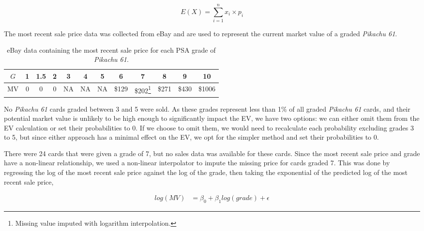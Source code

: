 \documentclass{article}
\begin{document}
$$E(X) = \sum_{i = 1}^{n} x_i \times p_i$$

The most recent sale price data was collected from eBay and are used to represent the current market value of a graded \textit{Pikachu 61}.

\begin{table}[!h]
    \begin{minipage}{\textwidth}
        \begin{center}
            \begin{tabular}{ |c|c|c|c|c|c|c|c|c|c|c|c| } 
                \hline
                $G$ & 1 & 1.5 & 2 & 3 & 4 & 5 & 6 & 7 & 8 & 9 & 10 \\
                \hline
                MV & 0 & 0 & 0 & NA & NA & NA & \$129 & \$202\footnote{Missing value imputed with logarithm interpolation.} & \$271 & \$430 & \$1006 \\
                \hline
            \end{tabular}
            \caption{\label{mv-tbl}eBay data containing the most recent sale price for each PSA grade of \textit{Pikachu 61}.}
        \end{center}
    \end{minipage}
\end{table}

No \textit{Pikachu 61} cards graded between 3 and 5 were sold. As these grades represent less than 1\% of all graded \textit{Pikachu 61} cards, and their potential market value is unlikely to be high enough to significantly impact the EV, we have two options: we can either omit them from the EV calculation or set their probabilities to 0. If we choose to omit them, we would need to recalculate each probability excluding grades 3 to 5, but since either approach has a minimal effect on the EV, we opt for the simpler method and set their probabilities to 0.

There were 24 cards that were given a grade of 7, but no sales data was available for these cards. Since the most recent sale price and grade have a non-linear relationship, we used a non-linear interpolator to impute the missing price for cards graded 7. This was done by regressing the log of the most recent sale price against the log of the grade, then taking the exponential of the predicted log of the most recent sale price,

\begin{align*}
    log(MV) &= \beta_0 + \beta_1 log(grade) + \epsilon
\end{align*}
\end{document}
